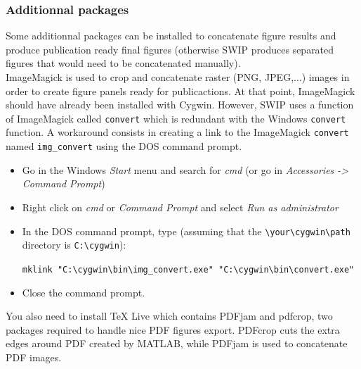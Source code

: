 \documentclass[twoside,a4paper]{article}
\begin{document}
\subsubsection{Additionnal packages}
\label{subsec:WinExtra}
Some additionnal packages can be installed to concatenate figure results and produce publication ready final figures (otherwise SWIP produces separated figures that would need to be concatenated manually).\\[2ex]
ImageMagick is used to crop and concatenate raster (PNG, JPEG,...) images in order to create figure panels ready for publicactions. At that point, ImageMagick should have already been installed with Cygwin. However, SWIP uses a function of ImageMagick called \verb|convert| which is redundant with the Windows \verb|convert| function. A workaround consists in creating a link to the ImageMagick \verb|convert| named \verb|img_convert| using the DOS command prompt.
\begin{itemize}
\setlength\itemsep{2ex}
\setlength{\parindent}{5ex}
\item Go in the Windows \textit{Start} menu and search for \textit{cmd} (or go in \textit{Accessories -> Command Prompt})
\item Right click on \textit{cmd} or \textit{Command Prompt} and select \textit{Run as administrator}
\item In the DOS command prompt, type (assuming that the \verb|\your\cygwin\path| directory is \verb|C:\cygwin|):

\verb|mklink "C:\cygwin\bin\img_convert.exe" "C:\cygwin\bin\convert.exe"|

\item Close the command prompt.
\end{itemize}
You also need to install TeX Live which contains PDFjam and pdfcrop, two packages required to handle nice PDF figures export. PDFcrop cuts the extra edges around PDF created by MATLAB, while PDFjam is used to concatenate PDF images.
\end{document}
